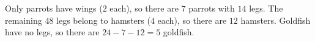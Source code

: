 Only parrots have wings ($2$ each), so there are $7$ parrots with $14$ legs. The remaining $48$ legs belong to hamsters ($4$ each), so there are $12$ hamsters. Goldfish have no legs, so there are $24-7-12=\boxed{5}$ goldfish.
